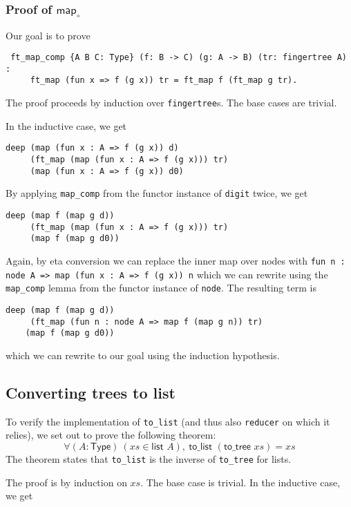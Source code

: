 \documentclass{article}
\newcommand{\code}[1]{\texttt{#1}}
\begin{document}
\subsubsection*{Proof of $\textsf{map}_{∘}$}
Our goal is to prove
\begin{verbatim}
 ft_map_comp {A B C: Type} (f: B -> C) (g: A -> B) (tr: fingertree A) :
     ft_map (fun x => f (g x)) tr = ft_map f (ft_map g tr).
\end{verbatim}

The proof proceeds by induction over \code{fingertree}s. The base cases
are trivial.

In the inductive case, we get

\begin{verbatim}
deep (map (fun x : A => f (g x)) d)
     (ft_map (map (fun x : A => f (g x))) tr)
     (map (fun x : A => f (g x)) d0)
\end{verbatim}

By applying \code{map\_comp} from the functor instance of \code{digit} twice, we get

\begin{verbatim}
deep (map f (map g d))
     (ft_map (map (fun x : A => f (g x))) tr)
     (map f (map g d0))
\end{verbatim}

Again, by eta conversion  we can replace the inner map over nodes with
\texttt{fun n : node A => map (fun x : A => f (g x)) n} which
we can rewrite using the \code{map\_comp} lemma from the functor
instance of \code{node}. The resulting term is

\begin{verbatim}
deep (map f (map g d))
     (ft_map (fun n : node A => map f (map g n)) tr)
    (map f (map g d0))
\end{verbatim}

which we can rewrite to our goal using the induction hypothesis.

\subsection{Converting trees to list}
To verify the implementation of \code{to\_list} (and thus also \code{reducer}
on which it relies), we set out to prove the following theorem:
$$
∀ (A : \textsf{Type})\ (xs ∈ \textsf{list } A),\
  \textsf{to\_list } (\textsf{to\_tree } xs) = xs
$$
The theorem states that \code{to\_list} is the inverse of \code{to\_tree}
for lists.

The proof is by induction on $xs$. The base case is trivial. In the
inductive case, we get
\end{document}
